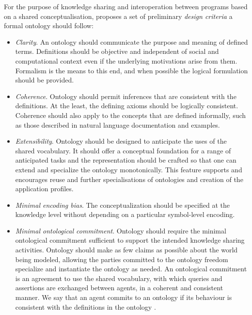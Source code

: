 	For the purpose of knowledge sharing and interoperation between programs based on a shared conceptualisation, \citet{gruber1995} proposes a set of preliminary \textit{design criteria} a formal ontology should follow:
	
	\begin{itemize}
		\item \textit{Clarity}. An ontology should communicate the purpose and meaning of defined terms. Definitions should be objective and independent of social and computational context even if the underlying motivations arise from them. Formalism is the means to this end, and when possible the logical formulation should be provided.
		\item \textit{Coherence}. Ontology should permit inferences that are consistent with the definitions. At the least, the defining axioms should be logically consistent. Coherence should also apply to the concepts that are defined informally, such as those described in natural language documentation and examples.
		\item \textit{Extensibility}. Ontology should be designed to anticipate the uses of the shared vocabulary. It should offer a conceptual foundation for a range of anticipated tasks and the representation should be crafted so that one can extend and specialize the ontology monotonically. This feature supports and encourages reuse and further specialisations of ontologies and creation of the application profiles. 
		\item \textit{Minimal encoding bias}. The conceptualization should be specified at the knowledge level without depending on a particular symbol-level encoding. 
		\item \textit{Minimal ontological commitment}. Ontology should require the minimal ontological commitment sufficient to support the intended knowledge sharing activities. Ontology should make as few claims as possible about the world being modeled, allowing the parties committed to the ontology freedom specialize and instantiate the ontology as needed. An ontological commitment is an agreement to use the shared vocabulary, with which queries and assertions are exchanged between agents, in a coherent and consistent manner. We say that an agent commits to an ontology if its behaviour is consistent with the definitions in the ontology \cite{gruber1995}.		
	\end{itemize}	